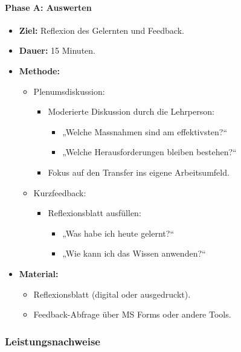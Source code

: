 \documentclass[
11pt,
captions=tableheading,
smallheadings,
headsepline,
footsepline, 
captions=tableheading,
parskip=half-,
]{scrartcl}
\begin{document}
\paragraph{Phase A: Auswerten}
\begin{itemize}
    \item \textbf{Ziel:} Reflexion des Gelernten und Feedback.
    \item \textbf{Dauer:} 15 Minuten.
    \item \textbf{Methode:}
    \begin{itemize}
        \item Plenumsdiskussion:
        \begin{itemize}
            \item Moderierte Diskussion durch die Lehrperson:
            \begin{itemize}
                \item „Welche Massnahmen sind am effektivsten?“
                \item „Welche Herausforderungen bleiben bestehen?“
            \end{itemize}
            \item Fokus auf den Transfer ins eigene Arbeitsumfeld.
        \end{itemize}
        \item Kurzfeedback:
        \begin{itemize}
            \item Reflexionsblatt ausfüllen:
            \begin{itemize}
                \item „Was habe ich heute gelernt?“
                \item „Wie kann ich das Wissen anwenden?“
            \end{itemize}
        \end{itemize}
    \end{itemize}
    \item \textbf{Material:}
    \begin{itemize}
        \item Reflexionsblatt (digital oder ausgedruckt).
        \item Feedback-Abfrage über MS Forms oder andere Tools.
    \end{itemize}
\end{itemize}
\subsubsection{Leistungsnachweise}
\end{document}
